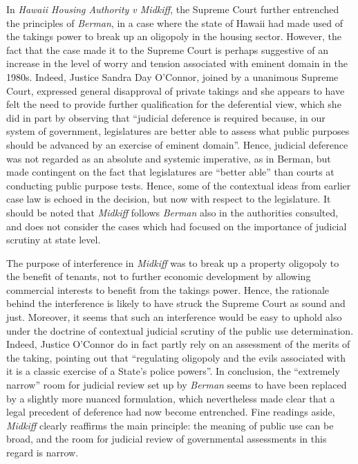 In {\it Hawaii Housing Authority v Midkiff}, the Supreme Court further entrenched the principles of {\it Berman}, in a case where the state of Hawaii had made used of the takings power to break up an oligopoly in the housing sector.  However, the fact that the case made it to the Supreme Court is perhaps suggestive of an increase in the level of worry and tension associated with eminent domain in the 1980s. Indeed, Justice Sandra Day O'Connor, joined by a unanimous Supreme Court, expressed general disapproval of private takings and she appears to have felt the need to provide further qualification for the deferential view, which she did in part by observing that ``judicial deference is required because, in our system of government, legislatures are better able to assess what public purposes should be advanced by an exercise of eminent domain''. Hence, judicial deference was not regarded as an absolute and systemic imperative, as in Berman, but made contingent on the fact that legislatures are ``better able'' than courts at conducting public purpose tests. Hence, some of the contextual ideas from earlier case law is echoed in the decision, but now with respect to the legislature. It should be noted that {\it Midkiff} follows {\it Berman} also in the authorities consulted, and does not consider the cases which had focused on the importance of judicial scrutiny at state level.

The purpose of interference in {\it Midkiff} was to break up a property oligopoly to the benefit of tenants, not to further economic development by allowing commercial interests to benefit from the takings power. Hence, the rationale behind the interference is likely to have struck the Supreme Court as sound and just. Moreover, it seems that such an interference would be easy to uphold also under the doctrine of contextual judicial scrutiny of the public use determination. Indeed, Justice O'Connor do in fact partly rely on an assessment of the merits of the taking, pointing out that  ``regulating oligopoly and the evils associated with it is a classic exercise of a State's police powers''. In conclusion, the ``extremely narrow'' room for judicial review set up by {\it Berman} seems to have been replaced by a slightly more nuanced formulation, which nevertheless made clear that a legal precedent of deference had now become entrenched. Fine readings aside, {\it Midkiff} clearly reaffirms the main principle:  the meaning of public use can be broad, and the room for judicial review of governmental assessments in this regard is narrow.

